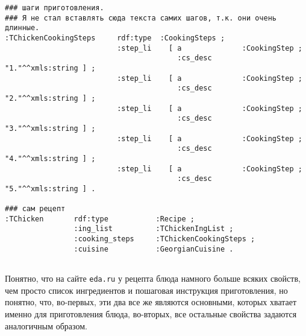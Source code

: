 \documentclass{article}
\begin{document}
\begin{verbatim}
### шаги приготовления.
### Я не стал вставлять сюда текста самих шагов, т.к. они очень длинные.
:TChickenCookingSteps     rdf:type  :CookingSteps ;
                          :step_li    [ a              :CookingStep ;
                                        :cs_desc       "1."^^xmls:string ] ;
                          :step_li    [ a              :CookingStep ;
                                        :cs_desc       "2."^^xmls:string ] ;
                          :step_li    [ a              :CookingStep ;
                                        :cs_desc       "3."^^xmls:string ] ;
                          :step_li    [ a              :CookingStep ;
                                        :cs_desc       "4."^^xmls:string ] ;
                          :step_li    [ a              :CookingStep ;
                                        :cs_desc       "5."^^xmls:string ] .

### сам рецепт
:TChicken       rdf:type           :Recipe ;
                :ing_list          :TChickenIngList ;
                :cooking_steps     :TChickenCookingSteps ;
                :cuisine           :GeorgianCuisine .


\end{verbatim}
 
Понятно, что на сайте \texttt{eda.ru} у рецепта блюда намного больше всяких свойств, чем просто
список ингредиентов и пошаговая инструкция приготовления, но понятно, что, во-первых, эти
два все же являются основными, которых хватает именно для приготовления блюда, во-вторых,
все остальные свойства задаются аналогичным образом.
\end{document}
